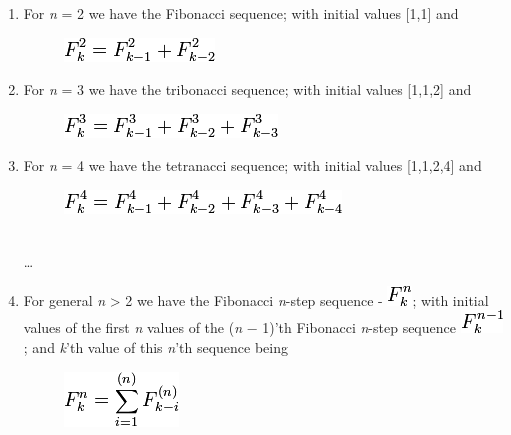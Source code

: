 \begin{enumerate}
\item
  For \emph{n} = 2 we have the Fibonacci sequence; with initial values
  {[}1,1{]} and
  \begin{figure}[H]
    \centering
    \includegraphics[scale=.6]{graphics/ea8fba6081e51a2e4f0cd0d58c3c7032.png}    
  \end{figure}
\item
  For \emph{n} = 3 we have the tribonacci sequence; with initial values
  {[}1,1,2{]} and
  \begin{figure}[H]
    \centering
     \includegraphics[scale=.6]{graphics/a96e7fe6a7eb7371ab85f6a135b84056.png}    
  \end{figure}
\item
  For \emph{n} = 4 we have the tetranacci sequence; with initial values
  {[}1,1,2,4{]} and
  \begin{figure}[H]
    \centering
    \includegraphics[scale=.6]{graphics/ea2b3ddffa2a578dbe5d923abd914aa5.png}
  \end{figure}

\\\ldots{}    

\item
  For general \emph{n} \textgreater{} 2 we have the Fibonacci
  \emph{n}-step sequence -
  \includegraphics[scale=.6]{graphics/f6e22469b4396d8fa34e202e5c716abc.png};
  with initial values of the first \emph{n} values of the (\emph{n} −
  1)'th Fibonacci \emph{n}-step sequence
  \includegraphics[scale=.6]{graphics/79293ba1053dbc3f23c579b2e8141034.png};
  and \emph{k}'th value of this \emph{n}'th sequence being

  \begin{figure}[H]
    \centering
     \includegraphics[scale=.6]{graphics/c53daded435e185afefbac417fef75e7.png}    
  \end{figure}
\end{enumerate}

